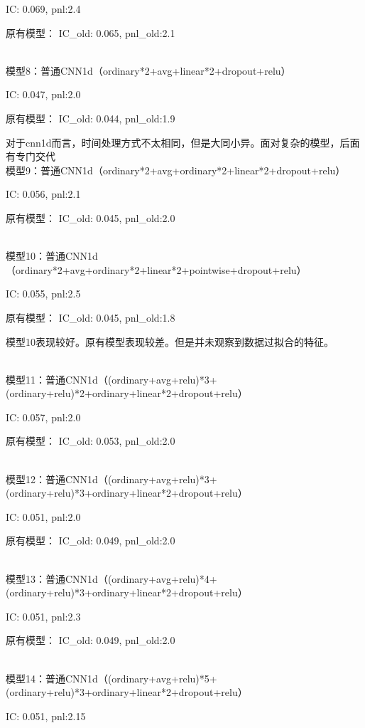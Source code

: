 \documentclass[11pt]{ctexart}
\begin{document}
{\kaishu \small IC: 0.069, pnl:2.4}

原有模型：
{\kaishu \small IC\_old: 0.065, pnl\_old:2.1}

~\\
模型8：普通CNN1d（ordinary*2+avg+linear*2+dropout+relu）

{\kaishu \small IC: 0.047, pnl:2.0}

原有模型：
{\kaishu \small IC\_old: 0.044, pnl\_old:1.9}

对于cnn1d而言，时间处理方式不太相同，但是大同小异。面对复杂的模型，后面有专门交代
~\\
模型9：普通CNN1d（ordinary*2+avg+ordinary*2+linear*2+dropout+relu）

{\kaishu \small IC: 0.056, pnl:2.1}

原有模型：
{\kaishu \small IC\_old: 0.045, pnl\_old:2.0}

~\\
模型10：普通CNN1d（ordinary*2+avg+ordinary*2+linear*2+pointwise+dropout+relu）

{\kaishu \small IC: 0.055, pnl:2.5}

原有模型：
{\kaishu \small IC\_old: 0.045, pnl\_old:1.8}

模型10表现较好。原有模型表现较差。但是并未观察到数据过拟合的特征。

~\\
模型11：普通CNN1d（(ordinary+avg+relu)*3+(ordinary+relu)*2+ordinary+linear*2+dropout+relu）

{\kaishu \small IC: 0.057, pnl:2.0}

原有模型：
{\kaishu \small IC\_old: 0.053, pnl\_old:2.0}

~\\
模型12：普通CNN1d（(ordinary+avg+relu)*3+(ordinary+relu)*3+ordinary+linear*2+dropout+relu）

{\kaishu \small IC: 0.051, pnl:2.0}

原有模型：
{\kaishu \small IC\_old: 0.049, pnl\_old:2.0}

~\\
模型13：普通CNN1d（(ordinary+avg+relu)*4+(ordinary+relu)*3+ordinary+linear*2+dropout+relu）

{\kaishu \small IC: 0.051, pnl:2.3}

原有模型：
{\kaishu \small IC\_old: 0.049, pnl\_old:2.0}

~\\
模型14：普通CNN1d（(ordinary+avg+relu)*5+(ordinary+relu)*3+ordinary+linear*2+dropout+relu）

{\kaishu \small IC: 0.051, pnl:2.15}
\end{document}

